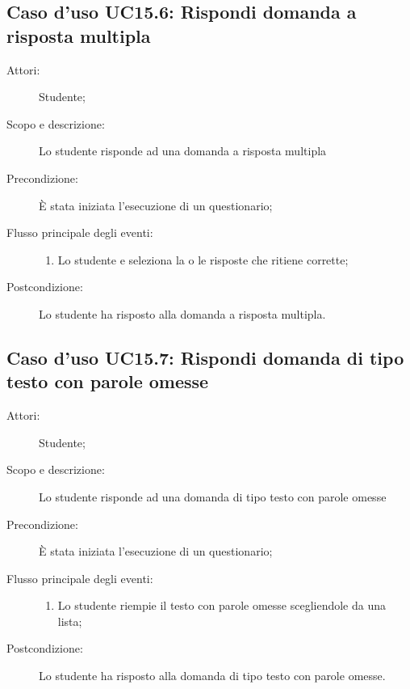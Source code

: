 \subsection{Caso d'uso UC15.6: Rispondi domanda a risposta multipla}\begin{description}
\item[Attori:] Studente;
\item[Scopo e descrizione:] Lo studente risponde ad una domanda a risposta multipla
      \item[Precondizione:] È stata iniziata l'esecuzione di un questionario;

        \item[Flusso principale degli eventi:] \begin{enumerate}
          \item Lo studente e seleziona la o le risposte che ritiene corrette;

      \end{enumerate}
    \item[Postcondizione:] Lo studente ha risposto alla domanda a risposta multipla.
  \end{description}
\hypertarget{UC15.7}{}
\subsection{Caso d'uso UC15.7: Rispondi domanda di tipo testo con parole omesse}\begin{description}
\item[Attori:] Studente;
\item[Scopo e descrizione:] Lo studente risponde ad una domanda di tipo testo con parole omesse
      \item[Precondizione:] È stata iniziata l'esecuzione di un questionario;

        \item[Flusso principale degli eventi:] \begin{enumerate}
          \item Lo studente riempie il testo con parole omesse scegliendole da una lista;

      \end{enumerate}
    \item[Postcondizione:] Lo studente ha risposto alla domanda di tipo testo con parole omesse.
  \end{description}
\hypertarget{UC15.8}{}
